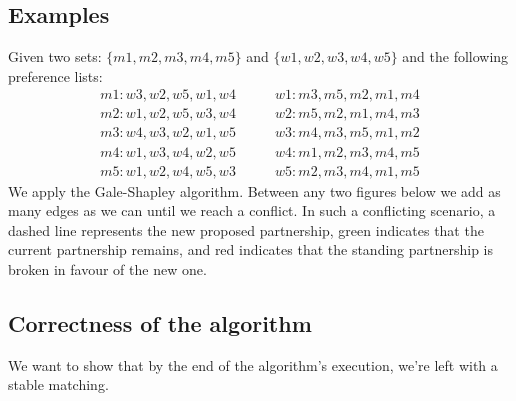 \documentclass[11pt]{article}
\begin{document}
\subsection{Examples}
Given two sets: $\{m1,m2,m3,m4,m5\}$ and $\{w1,w2,w3,w4,w5\}$ and the following preference lists:
\begin{align*}
	m1: w3,w2,w5,w1,w4&\qquad w1: m3,m5,m2,m1,m4\\
	m2: w1,w2,w5,w3,w4&\qquad w2: m5,m2,m1,m4,m3\\
	m3: w4,w3,w2,w1,w5&\qquad w3: m4,m3,m5,m1,m2\\
	m4: w1,w3,w4,w2,w5&\qquad w4: m1,m2,m3,m4,m5\\
	m5: w1,w2,w4,w5,w3&\qquad w5: m2,m3,m4,m1,m5
\end{align*}
We apply the Gale-Shapley algorithm. Between any two figures below we add as
many edges as we can until we reach a conflict. In such a conflicting scenario,
a dashed line represents the new proposed partnership, green indicates that the
current partnership remains, and red indicates that the standing partnership is
broken in favour of the new one.
\begin{figure}[H]
\centering
\begin{subfigure}{.33\textwidth}

\end{subfigure}
\begin{subfigure}{.33\textwidth}

\end{subfigure}
\end{figure}
\begin{figure}[H]
\centering
\begin{subfigure}{.33\textwidth}

\end{subfigure}
\begin{subfigure}{.33\textwidth}

\end{subfigure}
\end{figure}
\begin{figure}[H]
\centering
\begin{subfigure}{.33\textwidth}

\end{subfigure}
\begin{subfigure}{.33\textwidth}

\end{subfigure}
\end{figure}


\subsection{Correctness of the algorithm}
We want to show that by the end of the algorithm's execution, we're left with a
stable matching.
\newline
\end{document}
